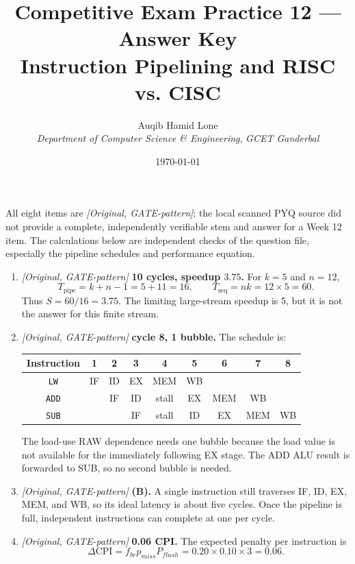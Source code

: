 \documentclass[11pt]{article}
\title{Competitive Exam Practice 12 --- Answer Key\\
  \large Instruction Pipelining and RISC vs. CISC}
\author{Auqib Hamid Lone\\[0.3em]
  \emph{Department of Computer Science \& Engineering}, \emph{GCET Ganderbal}}
\date{\today}
\begin{document}
\maketitle

\begin{sloppypar}
\noindent All eight items are \textit{[Original, GATE-pattern]}; the local
scanned PYQ source did not provide a complete, independently verifiable stem
and answer for a Week 12 item. The calculations below are independent checks
of the question file, especially the pipeline schedules and performance
equation.
\end{sloppypar}

\begin{enumerate}
\item[\textbf{Q1}] \textit{[Original, GATE-pattern]} \textbf{10 cycles,
speedup $3.75$.} For $k=5$ and $n=12$,
\[
  T_{\mathrm{pipe}}=k+n-1=5+11=16,
  \qquad T_{\mathrm{seq}}=nk=12\times5=60.
\]
Thus $S=60/16=3.75$. The limiting large-stream speedup is 5, but it is not
the answer for this finite stream.

\item[\textbf{Q2}] \textit{[Original, GATE-pattern]} \textbf{cycle 8,
1 bubble.} The schedule is:
\begin{center}
\begin{tabular}{c|cccccccc}
\textbf{Instruction} & 1 & 2 & 3 & 4 & 5 & 6 & 7 & 8 \\
\hline
\texttt{LW}  & IF & ID & EX & MEM & WB & & & \\
\texttt{ADD} & & IF & ID & stall & EX & MEM & WB & \\
\texttt{SUB} & & & IF & stall & ID & EX & MEM & WB
\end{tabular}
\end{center}
The load-use RAW dependence needs one bubble because the load value is not
available for the immediately following EX stage. The ADD ALU result is
forwarded to SUB, so no second bubble is needed.

\item[\textbf{Q3}] \textit{[Original, GATE-pattern]} \textbf{(B).} A single
instruction still traverses IF, ID, EX, MEM, and WB, so its ideal latency is
about five cycles. Once the pipeline is full, independent instructions can
complete at one per cycle.

\item[\textbf{Q4}] \textit{[Original, GATE-pattern]} \textbf{0.06 CPI.}
The expected penalty per instruction is
\[
  \Delta\mathrm{CPI}=f_{br}p_{miss}P_{flush}
  =0.20\times0.10\times3=0.06.
\]


\end{enumerate}
\end{document}
